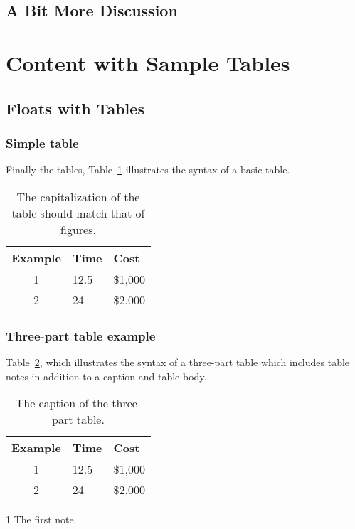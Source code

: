 \subsection{A Bit More Discussion}
\lipsum[16-19]

\section{Content with Sample Tables}

\lipsum[15]

\subsection{Floats with Tables}

\lipsum[16]

\subsubsection{Simple table}

Finally the tables, Table~\ref{tbl:tbl01} illustrates the syntax of a
basic table. %
\begin{table}[tb]
  \caption{The capitalization of the table should match that of figures.}
  \label{tbl:tbl01}
  \begin{center}
  \begin{tabular}{c l l}
  \hline
  Example & Time & Cost \\
  \hline
  1 & 12.5 & \$1,000 \\
  2 & 24 & \$2,000 \\
  \hline
  \end{tabular}
  \end{center}
\end{table}
\lipsum[16-18]

\subsubsection{Three-part table example}

Table~\ref{tbl:tbl02}, which illustrates the syntax of a three-part
table which includes table notes in addition to a caption and table
body.
\begin{table}[tb]
\begin{threeparttable}
  \caption{The caption of the three-part table.}
  \label{tbl:tbl02}
  \begin{center}
\begin{tabular*}{\textwidth}{c l l} %
  \hline
  Example & Time\tnote{1} & Cost \\
  \hline
  1 & 12.5 & \$1,000 \\
  2 & 24 & \$2,000 \\
  \hline
\end{tabular*}
\begin{tablenotes}
  \item [1] The first note.
\end{tablenotes}
  \end{center}
\end{threeparttable}
\end{table}
\lipsum[19-21]

